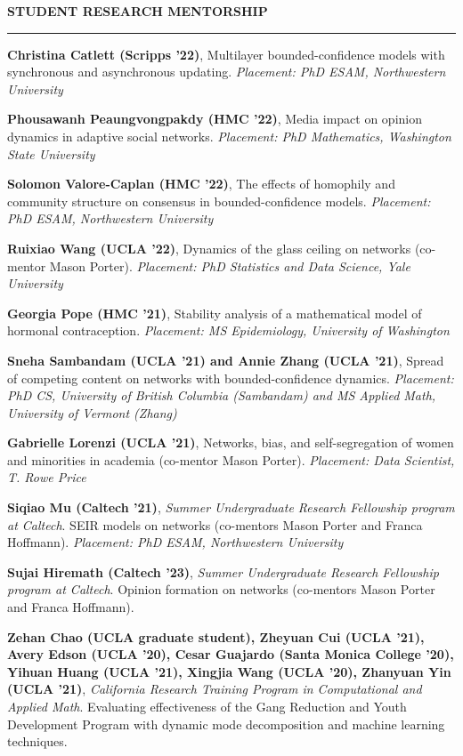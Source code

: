 \documentclass{resume} %
\renewenvironment{rSection}[1]{
\sectionskip
\textcolor{WinePurple}{\MakeUppercase{#1}}
\sectionlineskip
\hrule
\begin{list}{}{
\setlength{\leftmargin}{1.5em}
}
\item[]
}{
\end{list}
}
\begin{document}
\begin{rSection}{\bf Student Research Mentorship}
    \item \textbf{Christina Catlett (Scripps '22)}, Multilayer bounded-confidence models with synchronous and asynchronous updating. 
    {\em Placement: PhD ESAM, Northwestern University}

    \item \textbf{Phousawanh Peaungvongpakdy (HMC '22)}, Media impact on opinion dynamics in adaptive social networks.
    {\em Placement: PhD Mathematics, Washington State University}

    \item \textbf{Solomon Valore-Caplan (HMC '22)}, The effects of homophily and community structure on consensus in bounded-confidence models.
    {\em Placement: PhD ESAM, Northwestern University}

    \item \textbf{Ruixiao Wang (UCLA '22)}, Dynamics of the glass ceiling on networks (co-mentor Mason Porter). 
    {\em Placement: PhD Statistics and Data Science, Yale University} 

    \item \textbf{Georgia Pope (HMC '21)}, Stability analysis of a mathematical model of hormonal contraception. 
    {\em Placement: MS Epidemiology, University of Washington}

    \item \textbf{Sneha Sambandam (UCLA '21) and Annie Zhang (UCLA '21)}, Spread of competing content on networks with bounded-confidence dynamics.
    {\em Placement: PhD CS, University of British Columbia (Sambandam) and MS Applied Math, University of Vermont (Zhang)}

    \item \textbf{Gabrielle Lorenzi (UCLA '21)}, Networks, bias, and self-segregation of women and minorities in academia (co-mentor Mason Porter). 
    {\em Placement: Data Scientist, T. Rowe Price}

    \item \textbf{Siqiao Mu (Caltech '21)}, {\em Summer Undergraduate Research Fellowship program at Caltech}. SEIR models on networks (co-mentors Mason Porter and Franca Hoffmann). 
    {\em Placement: PhD ESAM, Northwestern University}

    \item \textbf{Sujai Hiremath (Caltech '23)}, {\em Summer Undergraduate Research Fellowship program at Caltech}. Opinion formation on networks (co-mentors Mason Porter and Franca Hoffmann).
    
    \item \textbf{Zehan Chao (UCLA graduate student), Zheyuan Cui (UCLA '21), Avery Edson (UCLA '20), Cesar Guajardo (Santa Monica College '20), Yihuan Huang (UCLA '21), Xingjia Wang (UCLA '20), Zhanyuan Yin (UCLA '21)}, {\em California Research Training Program in Computational and Applied Math}. Evaluating effectiveness of the Gang Reduction and Youth Development Program with dynamic mode decomposition and machine learning techniques.
    

\end{rSection}
\end{document}
